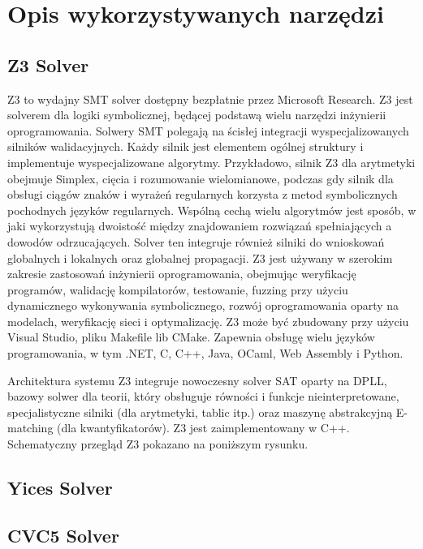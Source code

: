 \chapter{Opis wykorzystywanych narzędzi}

\section{Z3 Solver}
Z3 to wydajny SMT solver dostępny bezpłatnie przez Microsoft Research. Z3 jest solverem dla logiki symbolicznej, będącej podstawą wielu narzędzi inżynierii oprogramowania. Solwery SMT polegają na ścisłej integracji wyspecjalizowanych silników walidacyjnych. Każdy silnik jest elementem ogólnej struktury i implementuje wyspecjalizowane algorytmy. Przykładowo, silnik Z3 dla arytmetyki obejmuje Simplex, cięcia i rozumowanie wielomianowe, podczas gdy silnik dla obsługi ciągów znaków i wyrażeń regularnych korzysta z metod symbolicznych pochodnych języków regularnych. Wspólną cechą wielu algorytmów jest sposób, w jaki wykorzystują dwoistość między znajdowaniem rozwiązań spełniających a dowodów odrzucających. Solver ten integruje również silniki do wnioskowań globalnych i lokalnych oraz globalnej propagacji.
Z3 jest używany w szerokim zakresie zastosowań inżynierii oprogramowania, obejmując weryfikację programów, walidację kompilatorów, testowanie, fuzzing przy użyciu dynamicznego wykonywania symbolicznego, rozwój oprogramowania oparty na modelach, weryfikację sieci i optymalizację.
Z3 może być zbudowany przy użyciu Visual Studio, pliku Makefile lib CMake. Zapewnia obsługę wielu języków programowania, w tym .NET, C, C++, Java, OCaml, Web Assembly i Python.

Architektura systemu
Z3 integruje nowoczesny solver SAT oparty na DPLL, bazowy solwer dla teorii, który obsługuje równości i funkcje nieinterpretowane, specjalistyczne silniki (dla arytmetyki, tablic itp.) oraz maszynę abstrakcyjną E-matching (dla kwantyfikatorów). Z3 jest zaimplementowany w C++. Schematyczny przegląd Z3 pokazano na poniższym rysunku.

\section{Yices Solver}


\section{CVC5 Solver}